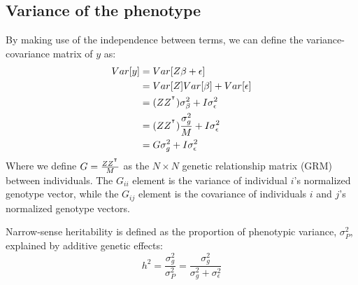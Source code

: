 \documentclass[12pt]{article}
\begin{document}
\subsection{Variance of the phenotype}
By making use of the independence between terms, we can define the variance-covariance matrix of $y$ as:
\begin{align*}
    Var[y] &= Var[Z \beta + \epsilon] \\
    &= Var[Z] Var[\beta] + Var[\epsilon] \\
    &= (Z Z^{^\intercal}) \sigma_{\beta}^2 + I \sigma_{\epsilon}^2 \\
    &= (Z Z^{^\intercal}) \frac{\sigma_{g}^2}{M} + I \sigma_{\epsilon}^2 \\
    &= G \sigma_{g}^2 + I \sigma_{\epsilon}^2 \\
\end{align*}
Where we define $G = \frac{Z Z^{^\intercal}}{M}$ as the $N \times N$ genetic relationship matrix (GRM) between individuals.
The $G_{ii}$ element is the variance of individual $i$'s normalized genotype vector, while the $G_{ij}$ element is the covariance of individuals $i$ and $j$'s normalized genotype vectors.

Narrow-sense heritability is defined as the proportion of phenotypic variance, $\sigma_P^2$, explained by additive genetic effects:
$$ h^2 = \frac{\sigma_{g}^2}{\sigma_P^2} = \frac{\sigma_{g}^2}{\sigma_{g}^2 + \sigma_{\epsilon}^2} $$
\end{document}
